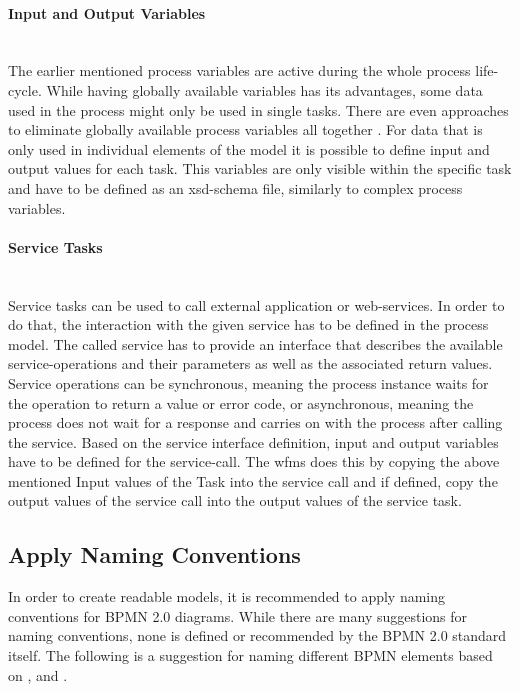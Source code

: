 \paragraph{Input and Output Variables}~\\
The earlier mentioned process variables are active during the whole process life-cycle. While having globally available variables has its advantages, some data used in the process might only be used in single tasks. There are even approaches to eliminate globally available process variables all together \cite{goodbye}. For data that is only used in individual elements of the model it is possible to define input and output values for each task. This variables are only visible within the specific task and have to be defined as an \gls{xsd}-schema file, similarly to complex process variables. \cite{fundamentals}

\paragraph{Service Tasks}~\\
Service tasks can be used to call external application or web-services. In order to do that, the interaction with the given service has to be defined in the process model. The called service has to provide an interface that describes the available service-operations and their parameters as well as the associated return values. Service operations can be synchronous, meaning the process instance waits for the operation to return a value or error code, or asynchronous, meaning the process does not wait for a response and carries on with the process after calling the service. Based on the service interface definition, input and output variables have to be defined for the service-call. The \gls{wfms} does this by copying the above mentioned Input values of the Task into the service call and if defined, copy the output values of the service call into the output values of the service task. \cite{fundamentals}

\subsection{Apply Naming Conventions}
\label{naming}
In order to create readable models, it is recommended to apply naming conventions for BPMN 2.0 diagrams. While there are many suggestions for naming conventions, none is defined or recommended by the BPMN 2.0 standard \cite{bpmnstandard} itself. The following is a suggestion for naming different BPMN elements based on  \cite{freund2019real}, \cite{c}   \cite{suarez2010best} and \cite{radulian2020rethinking}. 

